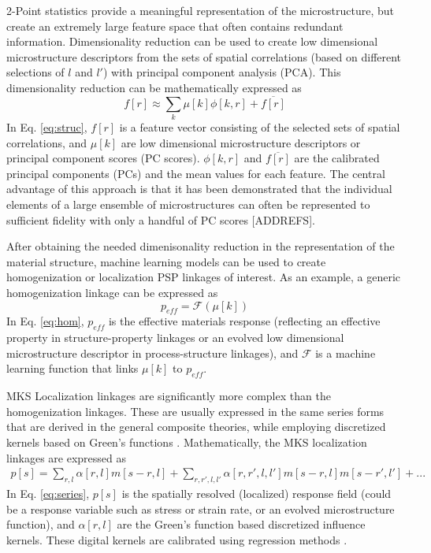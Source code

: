 \documentclass{bmcart}
\begin{document}
2-Point statistics provide a meaningful representation of the microstructure, but create an extremely large feature space that often contains redundant information. Dimensionality reduction can be used to create low dimensional microstructure descriptors from the sets of spatial correlations (based on different selections of $l$ and $l'$) with principal component analysis (PCA). This dimensionality reduction can be mathematically expressed as  
\begin{equation} \label{eq:struc}
    f[ r] \approx \sum_{k} \mu[k] \phi[k,  r] + \overline{f[ r]}
\end{equation}
In Eq. \ref{eq:struc}, $f[r]$ is a feature vector consisting of the selected sets of spatial correlations, and $\mu[k]$ are low dimensional microstructure descriptors or principal component scores (PC scores). $\phi[k, r]$ and $\overline{f[r]}$ are the calibrated principal components (PCs) and the mean values for each feature. The central advantage of this approach is that it has been demonstrated that the individual elements of a large ensemble of microstructures can often be represented to sufficient fidelity with only a handful of PC scores [ADDREFS].
 
After obtaining the needed dimenisonality reduction in the representation of the material structure, machine learning models can be used to create homogenization or localization PSP linkages of interest. As an example, a generic homogenization linkage can be expressed as
\begin{equation} \label{eq:hom}
    p_{eff} = \mathcal{F}(\mu[k])
\end{equation}
 In Eq. \ref{eq:hom}, $p_{eff}$ is the effective materials response (reflecting an effective property in structure-property linkages or an evolved low dimensional microstructure descriptor in process-structure linkages), and $\mathcal{F}$ is a machine learning function that links $\mu[k]$ to $p_{eff}$.

MKS Localization linkages are significantly more complex than the homogenization linkages. These are usually expressed in the same series forms that are derived in the general composite theories, while employing discretized kernels based on Green's functions \cite{brown1955solid, hill1963elastic, kroner1986statistical, kroner1977bounds, kroner1972statistical, etingof1993representations, adams1998mesostructure, fullwood2008strong, torquato2013random, li2006quantitative, milhans2011prediction, adams2013microstructure, garmestani2001statistical}. Mathematically, the MKS localization linkages are expressed as 
\begin{multline}
    \label{eq:series}
    p[s] = \sum_{r, l} \alpha[r, l] m[s - r, l] + \sum_{r, r', l, l'} \alpha[r, r', l, l'] m[s - r, l]m[s-r', l'] + ...
\end{multline}
In Eq. \ref{eq:series}, $p[s]$ is the spatially resolved (localized) response field (could be a response variable such as stress or strain rate, or an evolved microstructure function),  and $\alpha[r, l]$ are the Green's function based discretized influence kernels. These digital kernels are calibrated using regression methods \cite{al2012multi, kalidindi2010novel, landi2010multi, yabansu2014calibrated, yabansu2015representation, brough2016microstructure}.
\end{document}
